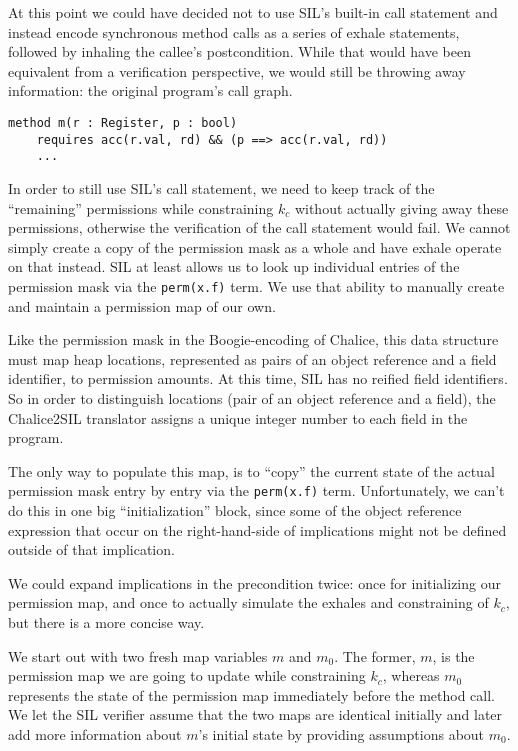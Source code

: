At this point we could have decided not to use SIL's built-in call statement and instead encode synchronous method calls as a series of exhale statements, followed by inhaling the callee's postcondition. 
While that would have been equivalent from a verification perspective, we would still be throwing away information: the original program's call graph.

\begin{sketch}
\begin{lstlisting}[language=Chalice]
method m(r : Register, p : bool)
	requires acc(r.val, rd) && (p ==> acc(r.val, rd))
	...	
\end{lstlisting}
\end{sketch}

In order to still use SIL's call statement, we need to keep track of the “remaining” permissions while constraining $k_c$ without actually giving away these permissions, otherwise the verification of the call statement would fail. 
We cannot simply create a copy of the permission mask as a whole and have exhale operate on that instead. 
SIL at least allows us to look up individual entries of the permission mask via the \lstinline!perm(x.f)! term. 
We use that ability to manually create and maintain a permission map of our own. 

Like the permission mask in the Boogie-encoding of Chalice, this data structure must map heap locations, represented as pairs of an object reference and a field identifier, to permission amounts. 
At this time, SIL has no reified field identifiers. 
So in order to distinguish locations (pair of an object reference and a field), the Chalice2SIL translator assigns a unique integer number to each field in the program. 

The only way to populate this map, is to ``copy'' the current state of the actual permission mask entry by entry via the \lstinline!perm(x.f)! term. 
Unfortunately, we can't do this in one big ``initialization'' block, since some of the object reference expression that occur on the right-hand-side of implications might not be defined outside of that implication. 

We could expand implications in the precondition twice: once for initializing our permission map, and once to actually simulate the exhales and constraining of $k_c$, but there is a more concise way.

We start out with two fresh map variables $m$ and $m_0$. The former, $m$, is the permission map we are going to update while constraining $k_c$, whereas $m_0$ represents the state of the permission map immediately before the method call. 
We let the SIL verifier assume that the two maps are identical initially and later add more information about $m$'s initial state by providing assumptions about $m_0$.

